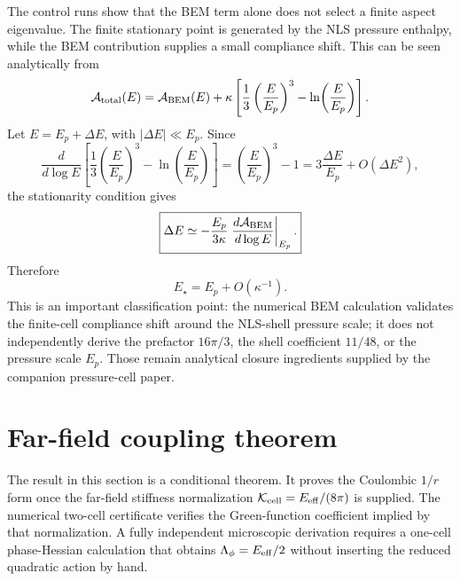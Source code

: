 \documentclass[11pt]{article}
\begin{document}
The control runs show that the BEM term alone does not select a finite aspect
eigenvalue.  The finite stationary point is generated by the NLS pressure
enthalpy, while the BEM contribution supplies a small compliance shift.  This
can be seen analytically from
\begin{equation}
  \mathcal A_{\rm total}(E)
  =
  \mathcal A_{\rm BEM}(E)
  +
  \kappa
  \left[
    \frac{1}{3}\left(\frac{E}{E_p}\right)^3
    -
    \ln\!\left(\frac{E}{E_p}\right)
  \right].
\end{equation}
Let \(E=E_p+\Delta E\), with \(|\Delta E|\ll E_p\).  Since
\begin{equation}
  \frac{d}{d\log E}
  \left[
    \frac{1}{3}\left(\frac{E}{E_p}\right)^3
    -
    \ln\!\left(\frac{E}{E_p}\right)
  \right]
  =
  \left(\frac{E}{E_p}\right)^3-1
  =
  3\frac{\Delta E}{E_p}
  +
  O(\Delta E^2),
\end{equation}
the stationarity condition gives
\begin{equation}
  \boxed{
  \Delta E
  \simeq
  -
  \frac{E_p}{3\kappa}
  \left.
  \frac{d\mathcal A_{\rm BEM}}{d\log E}
  \right|_{E_p}.
  }
  \label{eq:kappa-shift}
\end{equation}
Therefore
\begin{equation}
  E_\star=E_p+O(\kappa^{-1}).
\end{equation}
This is an important classification point: the numerical BEM calculation
validates the finite-cell compliance shift around the NLS-shell pressure scale;
it does not independently derive the prefactor \(16\pi/3\), the shell
coefficient \(11/48\), or the pressure scale \(E_p\).  Those remain analytical
closure ingredients supplied by the companion pressure-cell paper.

\section{Far-field coupling theorem}
\label{sec:farfield-theorem}

The result in this section is a conditional theorem.  It proves the Coulombic
\(1/r\) form once the far-field stiffness normalization
\(\mathcal K_{\rm cell}=E_{\rm eff}/(8\pi)\) is supplied.  The numerical
two-cell certificate verifies the Green-function coefficient implied by that
normalization.  A fully independent microscopic derivation requires a one-cell
phase-Hessian calculation that obtains \(\Lambda_\phi=E_{\rm eff}/2\) without
inserting the reduced quadratic action by hand.

\label{sec:farfield}
\end{document}
